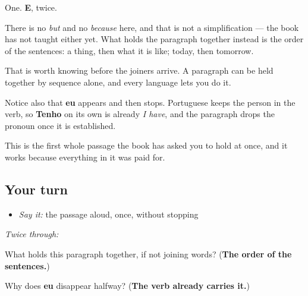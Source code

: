 \begin{culture}
One. \textbf{E}, twice.

There is no \emph{but} and no \emph{because} here, and that is not a simplification — the book has not taught either yet. What holds the paragraph together instead is the order of the sentences: a thing, then what it is like; today, then tomorrow.

That is worth knowing before the joiners arrive. A paragraph can be held together by sequence alone, and every language lets you do it.

Notice also that \textbf{eu} appears and then stops. Portuguese keeps the person in the verb, so \textbf{Tenho} on its own is already \emph{I have}, and the paragraph drops the pronoun once it is established.

This is the first whole passage the book has asked you to hold at once, and it works because everything in it was paid for.
\end{culture}

\subsection*{Your turn}
\begin{itemize}
\raggedright
  \item \emph{Say it:} the passage aloud, once, without stopping
\end{itemize}

\emph{Twice through:}

\begin{tcolorbox}[breakable,colback=teal!4,colframe=teal!35!black,title={Before you move on}]
What holds this paragraph together, if not joining words? (\textbf{The order of the sentences.})

Why does \textbf{eu} disappear halfway? (\textbf{The verb already carries it.})
\end{tcolorbox}

